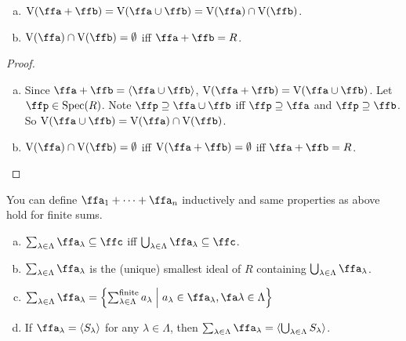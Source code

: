 \begin{proposition}
    \begin{enumerate}[(a)]
        \item $\operatorname{V}(\ffa + \ffb) = \operatorname{V}(\ffa \cup \ffb) = \operatorname{V}(\ffa) \cap \operatorname{V}(\ffb)$.
        \item $\operatorname{V}(\ffa) \cap \operatorname{V}(\ffb) = \emptyset$ iff $\ffa + \ffb = R$.
    \end{enumerate}
\end{proposition}

\begin{proof}
    \begin{enumerate}[(a)]
        \item 
            Since $\ffa + \ffb = \langle \ffa \cup \ffb \rangle$, $\operatorname{V}(\ffa + \ffb) = \operatorname{V}(\ffa \cup \ffb)$. Let $\ffp \in \operatorname{Spec}(R)$. Note $\ffp \supseteq \ffa \cup \ffb$ iff $\ffp \supseteq \ffa$ and $\ffp \supseteq \ffb$. So $\operatorname{V}(\ffa \cup \ffb) = \operatorname{V}(\ffa) \cap \operatorname{V}(\ffb)$.
        \item 
            $\operatorname{V}(\ffa) \cap \operatorname{V}(\ffb) = \emptyset$ iff $\operatorname{V}(\ffa + \ffb) = \emptyset$ iff $\ffa + \ffb = R$.
    \end{enumerate}
\end{proof}

\begin{remark}
    You can define $\ffa_1 + \cdots + \ffa_n$ inductively and same properties as above hold for finite sums.
\end{remark}

\begin{fact}
    \begin{enumerate}[(a)]
        \item $\sum_{\lambda \in \Lambda} \ffa_\lambda \subseteq \ffc$ iff $\bigcup_{\lambda \in \Lambda} \ffa_\lambda \subseteq \ffc$.
        \item $\sum_{\lambda \in \Lambda} \ffa_\lambda$ is the (unique) smallest ideal of $R$ containing $\bigcup_{\lambda \in \Lambda} \ffa_\lambda$.
        \item $\sum_{\lambda \in \Lambda} \ffa_\lambda = \left\{\sum_{\lambda \in \Lambda}^{\text{finite}}a_\lambda \mathrel{\Big |} a_\lambda \in \ffa_\lambda, \fa \lambda \in \Lambda\right\}$
        \item If $\ffa_\lambda = \langle S_\lambda \rangle$ for any $\lambda \in \Lambda$, then $\sum_{\lambda \in \Lambda} \ffa_\lambda = \langle \bigcup_{\lambda \in \Lambda}S_\lambda \rangle$.
    \end{enumerate}
\end{fact}

